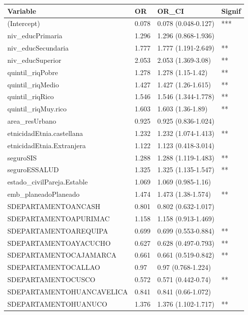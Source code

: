 \begin{tabular}{llll}
  \toprule
Variable & OR & OR\_CI & Signif \\ 
  \midrule
(Intercept) & 0.078 & 0.078 (0.048-0.127) & *** \\ 
  niv\_educPrimaria & 1.296 & 1.296 (0.868-1.936) &  \\ 
  niv\_educSecundaria & 1.777 & 1.777 (1.191-2.649) & ** \\ 
  niv\_educSuperior & 2.053 & 2.053 (1.369-3.08) & ** \\ 
  quintil\_riqPobre & 1.278 & 1.278 (1.15-1.42) & ** \\ 
  quintil\_riqMedio & 1.427 & 1.427 (1.26-1.615) & ** \\ 
  quintil\_riqRico & 1.546 & 1.546 (1.344-1.778) & ** \\ 
  quintil\_riqMuy.rico & 1.603 & 1.603 (1.36-1.89) & ** \\ 
  area\_resUrbano & 0.925 & 0.925 (0.836-1.024) &  \\ 
  etnicidadEtnia.castellana & 1.232 & 1.232 (1.074-1.413) & ** \\ 
  etnicidadEtnia.Extranjera & 1.122 & 1.123 (0.418-3.014) &  \\ 
  seguroSIS & 1.288 & 1.288 (1.119-1.483) & ** \\ 
  seguroESSALUD & 1.325 & 1.325 (1.135-1.547) & ** \\ 
  estado\_civilPareja.Estable & 1.069 & 1.069 (0.985-1.16) &  \\ 
  emb\_planeadoPlaneado & 1.474 & 1.473 (1.38-1.574) & ** \\ 
  SDEPARTAMENTOANCASH & 0.801 & 0.802 (0.632-1.017) &  \\ 
  SDEPARTAMENTOAPURIMAC & 1.158 & 1.158 (0.913-1.469) &  \\ 
  SDEPARTAMENTOAREQUIPA & 0.699 & 0.699 (0.553-0.884) & ** \\ 
  SDEPARTAMENTOAYACUCHO & 0.627 & 0.628 (0.497-0.793) & ** \\ 
  SDEPARTAMENTOCAJAMARCA & 0.661 & 0.661 (0.519-0.842) & ** \\ 
  SDEPARTAMENTOCALLAO & 0.97 & 0.97 (0.768-1.224) &  \\ 
  SDEPARTAMENTOCUSCO & 0.572 & 0.571 (0.442-0.74) & ** \\ 
  SDEPARTAMENTOHUANCAVELICA & 0.841 & 0.841 (0.66-1.072) &  \\ 
  SDEPARTAMENTOHUANUCO & 1.376 & 1.376 (1.102-1.717) & ** \\ 

\end{tabular}

